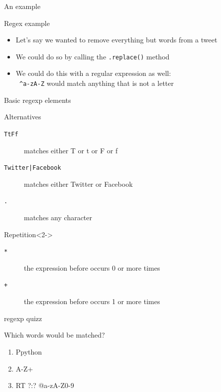 \documentclass[compress]{beamer}
\begin{document}
\begin{frame}{An example}
\begin{block}{Regex example}
\begin{itemize}
\item Let's say we wanted to remove everything but words from a tweet
\item We could do so by calling the \texttt{.replace()} method
\item We could do this with a regular expression as well: \\
{\tt{ \lbrack \^{}a-zA-Z\rbrack}} would match anything that is not a letter
\end{itemize}
\end{block}
\end{frame}

\begin{frame}{Basic regexp elements}
\begin{block}{Alternatives}
\begin{description}
\item[{\tt{\lbrack TtFf\rbrack}}] matches either T or t or F or f
\item[{\tt{Twitter|Facebook}}] matches either Twitter or Facebook
\item[{\tt{.}}] matches any character
\end{description}
\end{block}
\begin{block}{Repetition}<2->
\begin{description}
\item[{\tt{*}}] the expression before occurs 0 or more times
\item[{\tt{+}}] the expression before occurs 1 or more times
\end{description}
\end{block}
\end{frame}

\begin{frame}{regexp quizz}
\begin{block}{Which words would be matched?}
\tt
\begin{enumerate}
\item<1-> \lbrack Pp\rbrack ython
\item<2-> \lbrack A-Z\rbrack +
\item<3-> RT ?:? @\lbrack a-zA-Z0-9\rbrack *
\end{enumerate}
\end{block}
\end{frame}
\end{document}
